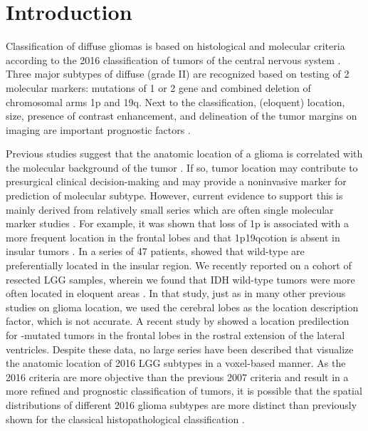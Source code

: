 \section{Introduction}
Classification of diffuse gliomas is based on histological and molecular criteria according to the 2016  classification of tumors of the central nervous system \autocite{louis2014international}.
Three major subtypes of diffuse  (grade II)  are recognized based on testing of 2 molecular markers: mutations of  1 or 2 gene and combined deletion of chromosomal arms 1p and 19q.
Next to the  classification, (eloquent) location, size, presence of contrast enhancement, and delineation of the tumor margins on  imaging are important prognostic factors \autocite{pignatti2002prognostic, jakola2012low, capelle2013spontaneous, chang2008preoperative}.

Previous studies suggest that the anatomic location of a glioma is correlated with the molecular background of the tumor \autocite{stockhammer2012idh1, goze2009lack, laigle2004correlations, metellus2010absence}.
If so, tumor location may contribute to presurgical clinical decision-making and may provide a noninvasive marker for prediction of molecular subtype.
However, current evidence to support this is mainly derived from relatively small series which are often single molecular marker studies  \autocite{stockhammer2012idh1, goze2009lack, laigle2004correlations, metellus2010absence}.
For example, it was shown that loss of 1p is associated with a more frequent location in the frontal lobes and that \acl{1p19qcotion} is absent in insular tumors \autocite{goze2009lack, laigle2004correlations}.
In a series of 47 patients, \citeauthor*{metellus2010absence} showed that  wild-type  are preferentially located in the insular region.
We recently reported on a cohort of resected LGG samples, wherein we found that IDH wild-type tumors were more often located in eloquent areas \autocite{wijnenga2017impact}.
In that study, just as in many other previous studies on glioma location, we used the cerebral lobes as the location description factor, which is not accurate.
A recent study by \citeauthor*{tejada2018voxel} showed a location predilection for -mutated tumors in the frontal lobes in the rostral extension of the lateral ventricles.
Despite these data, no large series have been described that visualize the anatomic location of  2016 LGG subtypes in a voxel-based manner.
As the  2016 criteria are more objective than the previous  2007 criteria and result in a more refined and prognostic classification of tumors, it is possible that the spatial distributions of different  2016 glioma subtypes are more distinct than previously shown for the classical histopathological classification \autocite{larjavaara2007incidence}.

